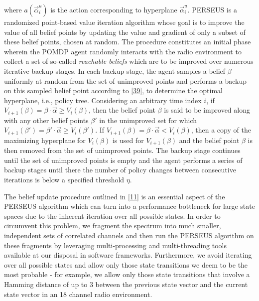 \documentclass[10pt,twocolumn]{IEEEtran}
\begin{document}
where $a(\vec{\alpha}_i^{u})$ is the action corresponding to hyperplane $\vec{\alpha}_i^{u}$. PERSEUS is a randomized point-based value iteration algorithm whose goal is to improve the value of all belief points by updating the value and gradient of only a subset of these belief points, chosen at random. The procedure constitutes an initial phase wherein the POMDP agent randomly interacts with the radio environment to collect a set of so-called \emph{reachable beliefs} which are to be improved over numerous iterative backup stages. In each backup stage, the agent samples a belief $\beta$ uniformly at random from the set of unimproved points and performs a backup on this sampled belief point according to \eqref{39}, to determine the optimal hyperplane, i.e., policy tree. Considering an arbitrary time index $i$, if $V_{i+1}(\beta) = \beta \cdot \vec{\alpha} \geq V_{i}(\beta)$, then the belief point $\beta$ is said to be improved along with any other belief points $\beta'$ in the unimproved set for which $V_{i+1}(\beta') = \beta' \cdot \vec{\alpha} \geq V_{i}(\beta')$. If $V_{i+1}(\beta) = \beta \cdot \vec{\alpha} < V_{i}(\beta)$, then a copy of the maximizing hyperplane for $V_i(\beta)$ is used for $V_{i+1}(\beta)$ and the belief point $\beta$ is then removed from the set of unimproved points. The backup stage continues until the set of unimproved points is empty and the agent performs a series of backup stages until there the number of policy changes between consecutive iterations is below a specified threshold $\eta$.

The belief update procedure outlined in \eqref{11} is an essential aspect of the PERSEUS algorithm which can turn into a performance bottleneck for large state spaces due to the inherent iteration over all possible states. In order to circumvent this problem, we fragment the spectrum into much smaller, independent sets of correlated channels and then run the PERSEUS algorithm on these fragments by leveraging multi-processing and multi-threading tools available at our disposal in software frameworks. Furthermore, we avoid iterating over all possible states and allow only those state transitions we deem to be the most probable - for example, we allow only those state transitions that involve a Hamming distance of up to 3 between the previous state vector and the current state vector in an 18 channel radio environment.
\end{document}
